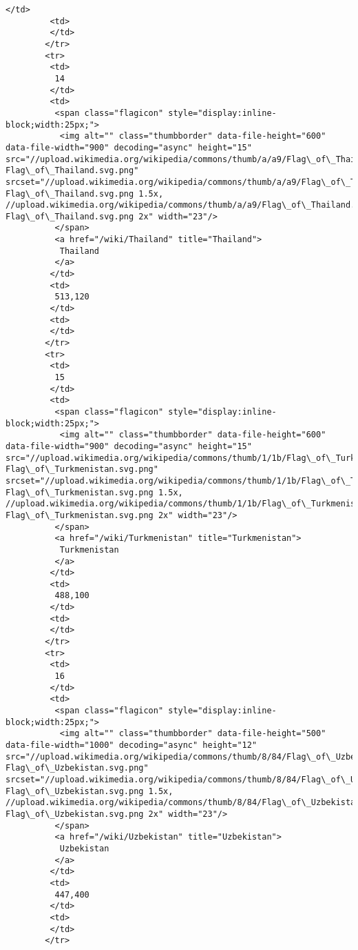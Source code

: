 \documentclass[11pt]{article}
\begin{document}
\begin{Verbatim}[commandchars=\\\{\}]
         </td>
         <td>
         </td>
        </tr>
        <tr>
         <td>
          14
         </td>
         <td>
          <span class="flagicon" style="display:inline-block;width:25px;">
           <img alt="" class="thumbborder" data-file-height="600" data-file-width="900" decoding="async" height="15" src="//upload.wikimedia.org/wikipedia/commons/thumb/a/a9/Flag\_of\_Thailand.svg/23px-Flag\_of\_Thailand.svg.png" srcset="//upload.wikimedia.org/wikipedia/commons/thumb/a/a9/Flag\_of\_Thailand.svg/35px-Flag\_of\_Thailand.svg.png 1.5x, //upload.wikimedia.org/wikipedia/commons/thumb/a/a9/Flag\_of\_Thailand.svg/45px-Flag\_of\_Thailand.svg.png 2x" width="23"/>
          </span>
          <a href="/wiki/Thailand" title="Thailand">
           Thailand
          </a>
         </td>
         <td>
          513,120
         </td>
         <td>
         </td>
        </tr>
        <tr>
         <td>
          15
         </td>
         <td>
          <span class="flagicon" style="display:inline-block;width:25px;">
           <img alt="" class="thumbborder" data-file-height="600" data-file-width="900" decoding="async" height="15" src="//upload.wikimedia.org/wikipedia/commons/thumb/1/1b/Flag\_of\_Turkmenistan.svg/23px-Flag\_of\_Turkmenistan.svg.png" srcset="//upload.wikimedia.org/wikipedia/commons/thumb/1/1b/Flag\_of\_Turkmenistan.svg/35px-Flag\_of\_Turkmenistan.svg.png 1.5x, //upload.wikimedia.org/wikipedia/commons/thumb/1/1b/Flag\_of\_Turkmenistan.svg/45px-Flag\_of\_Turkmenistan.svg.png 2x" width="23"/>
          </span>
          <a href="/wiki/Turkmenistan" title="Turkmenistan">
           Turkmenistan
          </a>
         </td>
         <td>
          488,100
         </td>
         <td>
         </td>
        </tr>
        <tr>
         <td>
          16
         </td>
         <td>
          <span class="flagicon" style="display:inline-block;width:25px;">
           <img alt="" class="thumbborder" data-file-height="500" data-file-width="1000" decoding="async" height="12" src="//upload.wikimedia.org/wikipedia/commons/thumb/8/84/Flag\_of\_Uzbekistan.svg/23px-Flag\_of\_Uzbekistan.svg.png" srcset="//upload.wikimedia.org/wikipedia/commons/thumb/8/84/Flag\_of\_Uzbekistan.svg/35px-Flag\_of\_Uzbekistan.svg.png 1.5x, //upload.wikimedia.org/wikipedia/commons/thumb/8/84/Flag\_of\_Uzbekistan.svg/46px-Flag\_of\_Uzbekistan.svg.png 2x" width="23"/>
          </span>
          <a href="/wiki/Uzbekistan" title="Uzbekistan">
           Uzbekistan
          </a>
         </td>
         <td>
          447,400
         </td>
         <td>
         </td>
        </tr>

\end{Verbatim}
\end{document}
